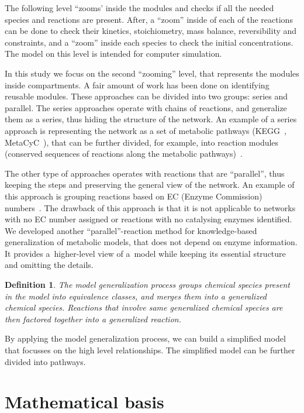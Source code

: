 \documentclass[9pt]{article}
\newcounter{def}
\newcounter{rm}
\begin{document}
The following  level ``zooms' inside the modules and checks if all the needed species and reactions are present.
After,  a ``zoom'' inside of each of the reactions can be done to check their kinetics, stoichiometry, mass balance, reversibility and constraints, and a ``zoom'' inside each species to check the initial concentrations. The model on this level is intended for computer simulation.

In this study we focus on the second ``zooming'' level, that represents the modules inside compartments. A fair amount of work has been done on identifying reusable modules. These approaches can be divided into two groups: series and parallel. The series approaches operate with chains of reactions, and generalize them as a series, thus hiding the structure of the network. An example of a series approach is representing the network as a set of metabolic pathways (KEGG~\citep{Kanehisa12}, MetaCyC~\citep{Caspi2012}), that can be further divided, for example, into reaction modules (conserved sequences of reactions along the metabolic pathways)~\citep{Muto2013}. 

The other type of approaches operates with reactions that are ``parallel'', thus keeping the steps and preserving the general view of the network. An example of this approach is grouping reactions based on EC (Enzyme Commission) numbers~\citep{Tohsato2000}. The drawback of this approach is that it is not applicable to networks with no EC number assigned or reactions with no catalysing enzymes identified. 
We developed another ``parallel''-reaction method for knowledge-based generalization of metabolic models, that does not depend on enzyme information. It provides a~higher-level view of a~model while keeping its essential structure and omitting the details. 


\newtheorem{eq00}[def]{Definition}
\begin{eq00}
The \emph{model generalization} process groups chemical species present in the model into equivalence classes, and merges them into a generalized chemical species. Reactions that involve same generalized chemical species are then factored together into a generalized reaction. 
\end{eq00}

By applying the model generalization process, we can build a simplified model that focusses on the high level relationships. The simplified model can be further divided into pathways. 

\newpage
\section*{Mathematical basis}
\end{document}
